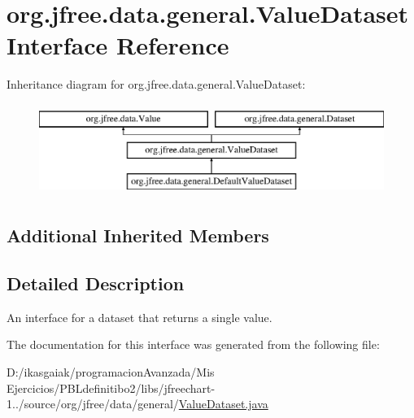 \hypertarget{interfaceorg_1_1jfree_1_1data_1_1general_1_1_value_dataset}{}\section{org.\+jfree.\+data.\+general.\+Value\+Dataset Interface Reference}
\label{interfaceorg_1_1jfree_1_1data_1_1general_1_1_value_dataset}
Inheritance diagram for org.\+jfree.\+data.\+general.\+Value\+Dataset\+:\begin{figure}[H]
\begin{center}
\leavevmode
\includegraphics[height=3.000000cm]{interfaceorg_1_1jfree_1_1data_1_1general_1_1_value_dataset}
\end{center}
\end{figure}
\subsection*{Additional Inherited Members}


\subsection{Detailed Description}
An interface for a dataset that returns a single value. 

The documentation for this interface was generated from the following file\+:\begin{DoxyCompactItemize}
\item 
D\+:/ikasgaiak/programacion\+Avanzada/\+Mis Ejercicios/\+P\+B\+Ldefinitibo2/libs/jfreechart-\/1../source/org/jfree/data/general/\mbox{\hyperlink{_value_dataset_8java}{Value\+Dataset.\+java}}\end{DoxyCompactItemize}
